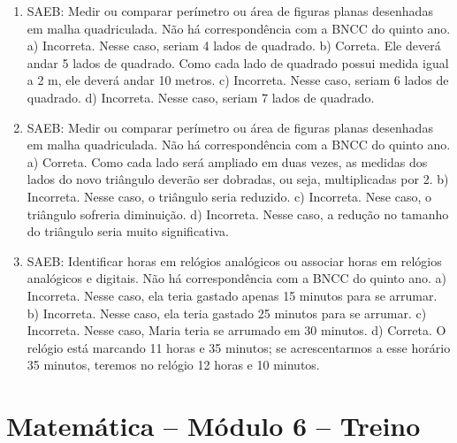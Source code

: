 \begin{enumerate}
\item
SAEB: Medir ou comparar perímetro ou área de figuras planas desenhadas em malha quadriculada.
Não há correspondência com a BNCC do quinto ano.
a) Incorreta. Nesse caso, seriam 4 lados de quadrado.
b) Correta. Ele deverá andar 5 lados de quadrado. Como cada lado de quadrado possui
medida igual a 2 m, ele deverá andar 10 metros.
c) Incorreta. Nesse caso, seriam 6 lados de quadrado.
d) Incorreta. Nesse caso, seriam 7 lados de quadrado.

\item
SAEB: Medir ou comparar perímetro ou área de figuras planas desenhadas em malha quadriculada.
Não há correspondência com a BNCC do quinto ano.
a) Correta. Como cada lado será ampliado em duas vezes, as medidas dos lados do novo
triângulo deverão ser dobradas, ou seja, multiplicadas por 2.
b) Incorreta. Nesse caso, o triângulo seria reduzido.
c) Incorreta. Nese caso, o triângulo sofreria diminuição.
d) Incorreta. Nesse caso, a redução no tamanho do triângulo seria muito significativa.

\item
SAEB: Identificar horas em relógios analógicos ou associar horas em relógios analógicos e digitais. Não há correspondência com a BNCC do quinto ano.
a) Incorreta. Nesse caso, ela teria gastado apenas 15 minutos para se arrumar.
b) Incorreta. Nesse caso, ela teria gastado 25 minutos para se arrumar.
c) Incorreta. Nesse caso, Maria teria se arrumado em 30 minutos.
d) Correta. O relógio está marcando 11 horas e 35 minutos; se acrescentarmos a esse
horário 35 minutos, teremos no relógio 12 horas e 10 minutos.
\end{enumerate}

\section*{Matemática -- Módulo 6 -- Treino}

